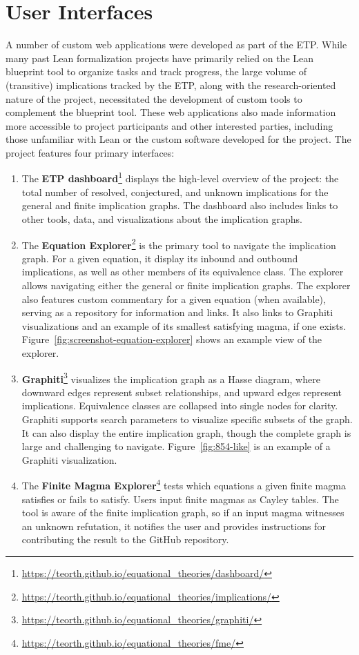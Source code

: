 \section{User Interfaces}

A number of custom web applications were developed as part of the ETP. While many past Lean formalization projects have primarily relied on the Lean blueprint tool to organize tasks and track progress, the large volume of (transitive) implications tracked by the ETP, along with the research-oriented nature of the project, necessitated the development of custom tools to complement the blueprint tool. These web applications also made information more accessible to project participants and other interested parties, including those unfamiliar with Lean or the custom software developed for the project. The project features four primary interfaces:

\begin{enumerate}
  \item The \textbf{ETP dashboard}\footnote{\url{https://teorth.github.io/equational_theories/dashboard/}} displays the high-level overview of the project: the total number of resolved, conjectured, and unknown implications for the general and finite implication graphs. The dashboard also includes links to other tools, data, and visualizations about the implication graphs.
  \item The \textbf{Equation Explorer}\footnote{\url{https://teorth.github.io/equational_theories/implications/}} is the primary tool to navigate the implication graph. For a given equation, it display its inbound and outbound implications, as well as other members of its equivalence class. The explorer allows navigating either the general or finite implication graphs. The explorer also features custom commentary for a given equation (when available), serving as a repository for information and links. It also links to Graphiti visualizations and an example of its smallest satisfying magma, if one exists. Figure~\ref{fig:screenshot-equation-explorer} shows an example view of the explorer.
  \item \textbf{Graphiti}\footnote{\url{https://teorth.github.io/equational_theories/graphiti/}} visualizes the implication graph as a Hasse diagram, where downward edges represent subset relationships, and upward edges represent implications. Equivalence classes are collapsed into single nodes for clarity. Graphiti supports search parameters to visualize specific subsets of the graph. It can also display the entire implication graph, though the complete graph is large and challenging to navigate. Figure~\ref{fig:854-like} is an example of a Graphiti visualization.
  \item The \textbf{Finite Magma Explorer}\footnote{\url{https://teorth.github.io/equational_theories/fme/}} tests which equations a given finite magma satisfies or fails to satisfy. Users input finite magmas as Cayley tables. The tool is aware of the finite implication graph, so if an input magma witnesses an unknown refutation, it notifies the user and provides instructions for contributing the result to the GitHub repository.
\end{enumerate}

